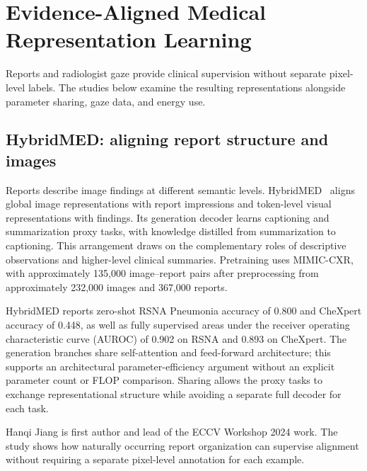 \section{Evidence-Aligned Medical Representation Learning}\label{sec:alignment}
Reports and radiologist gaze provide clinical supervision without separate pixel-level labels. The studies below examine the resulting representations alongside parameter sharing, gaze data, and energy use.
\subsection{HybridMED: aligning report structure and images}
Reports describe image findings at different semantic levels. HybridMED~\citep{hybridmed} aligns global image representations with report impressions and token-level visual representations with findings. Its generation decoder learns captioning and summarization proxy tasks, with knowledge distilled from summarization to captioning. This arrangement draws on the complementary roles of descriptive observations and higher-level clinical summaries. Pretraining uses MIMIC-CXR, with approximately 135,000 image--report pairs after preprocessing from approximately 232,000 images and 367,000 reports.

HybridMED reports zero-shot RSNA Pneumonia accuracy of 0.800 and CheXpert accuracy of 0.448, as well as fully supervised areas under the receiver operating characteristic curve (AUROC) of 0.902 on RSNA and 0.893 on CheXpert. The generation branches share self-attention and feed-forward architecture; this supports an architectural parameter-efficiency argument without an explicit parameter count or FLOP comparison. Sharing allows the proxy tasks to exchange representational structure while avoiding a separate full decoder for each task.

Hanqi Jiang is first author and lead of the ECCV Workshop 2024 work. The study shows how naturally occurring report organization can supervise alignment without requiring a separate pixel-level annotation for each example.

